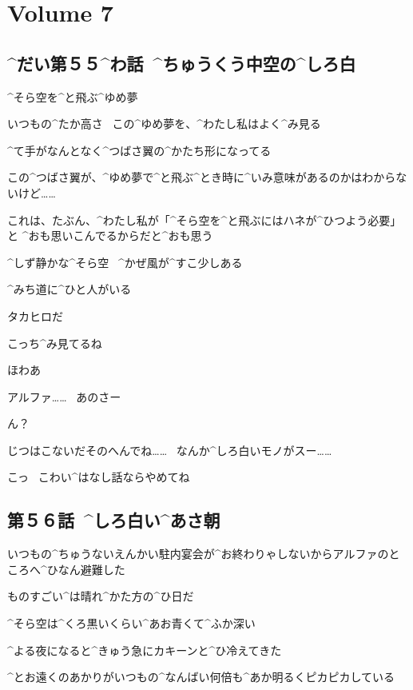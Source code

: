 \section{Volume 7}

\subsection{^{だい}{第}５５^{わ}{話}\ ^{ちゅうくう}{中空}の^{しろ}{白}}

\page[2]
\A ^{そら}{空}を^{と}{飛}ぶ^{ゆめ}{夢}

\A いつもの^{たか}{高}さ
\ この^{ゆめ}{夢}を、^{わたし}{私}はよく^{み}{見}る

\page
\A ^{て}{手}がなんとなく^{つばさ}{翼}の^{かたち}{形}になってる

\A この^{つばさ}{翼}が、^{ゆめ}{夢}で^{と}{飛}ぶ^{とき}{時}に^{いみ}{意味}があるのかはわからないけど……

\A これは、たぶん、^{わたし}{私}が「^{そら}{空}を^{と}{飛}ぶにはハネが^{ひつよう}{必要}」と
^{おも}{思}いこんでるからだと^{おも}{思}う

\page
\A ^{しず}{静}かな^{そら}{空}
\ ^{かぜ}{風}が^{すこ}{少}しある

\page
\A ^{みち}{道}に^{ひと}{人}がいる

\page
\A タカヒロだ

\A こっち^{み}{見}てるね

\page
\A ほわあ

\page
\T アルファ……
\ あのさー

\A ん？

\T じつはこないだそのへんでね……
\ なんか^{しろ}{白}いモノがスー……

\A こっ
\ こわい^{はなし}{話}ならやめてね


\subsection{第５６話\ ^{しろ}{白}い^{あさ}{朝}}

\page[10]
\T いつもの^{ちゅうないえんかい}{駐内宴会}が^{お}{終}わりゃしないからアルファのところへ^{ひなん}{避難}した

\T ものすごい^{は}{晴}れ^{かた}{方}の^{ひ}{日}だ

\T ^{そら}{空}は^{くろ}{黒}いくらい^{あお}{青}くて^{ふか}{深}い

\page[12]
\T ^{よる}{夜}になると^{きゅう}{急}にカキーンと^{ひ}{冷}えてきた

\T ^{とお}{遠}くのあかりがいつもの^{なんばい}{何倍}も^{あか}{明}るくピカピカしている

